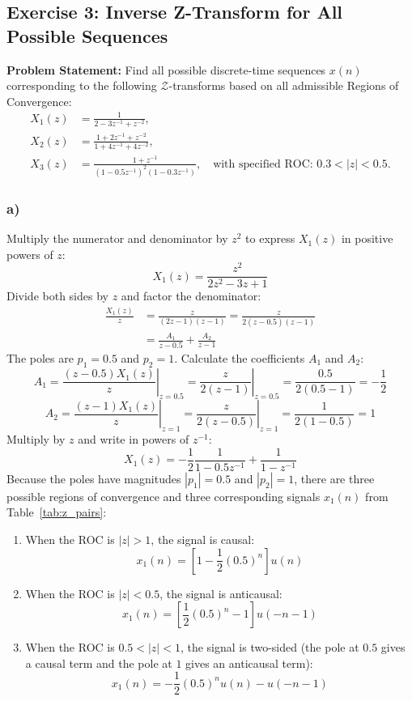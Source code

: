 \documentclass[12pt,a4paper]{article}
\begin{document}
\subsection{Exercise 3: Inverse Z-Transform for All Possible Sequences}
\textbf{Problem Statement:} Find all possible discrete-time sequences $x(n)$ corresponding to the following $\mathcal{Z}$-transforms based on all admissible Regions of Convergence:
\begin{align*}
    X_1(z) &= \frac{1}{2 - 3z^{-1} + z^{-2}}, \\
    X_2(z) &= \frac{1 + 2z^{-1} + z^{-2}}{1 + 4z^{-1} + 4z^{-2}}, \\
    X_3(z) &= \frac{1 + z^{-1}}{(1 - 0.5z^{-1})^2 (1 - 0.3z^{-1})}, \quad \text{with specified ROC: } 0.3 < |z| < 0.5.
\end{align*}

\subsubsection*{a)}
Multiply the numerator and denominator by $z^2$ to express $X_1(z)$ in positive powers of $z$:
\[
X_1(z) = \frac{z^2}{2z^2 - 3z + 1}
\]
Divide both sides by $z$ and factor the denominator:
\[
\begin{aligned}
\frac{X_1(z)}{z} &= \frac{z}{(2z - 1)(z - 1)} = \frac{z}{2(z - 0.5)(z - 1)} \\
&= \frac{A_1}{z - 0.5} + \frac{A_2}{z - 1}
\end{aligned}
\]
The poles are $p_1 = 0.5$ and $p_2 = 1$. Calculate the coefficients $A_1$ and $A_2$:
\[
A_1 = \left. \frac{(z - 0.5)X_1(z)}{z} \right|_{z = 0.5} = \left. \frac{z}{2(z - 1)} \right|_{z = 0.5} = \frac{0.5}{2(0.5 - 1)} = -\frac{1}{2}
\]
\[
A_2 = \left. \frac{(z - 1)X_1(z)}{z} \right|_{z = 1} = \left. \frac{z}{2(z - 0.5)} \right|_{z = 1} = \frac{1}{2(1 - 0.5)} = 1
\]
Multiply by $z$ and write in powers of $z^{-1}$:
\[
X_1(z) = -\frac{1}{2}\frac{1}{1 - 0.5z^{-1}} + \frac{1}{1 - z^{-1}}
\]
Because the poles have magnitudes $|p_1| = 0.5$ and $|p_2| = 1$, there are three possible regions of convergence and three corresponding signals $x_1(n)$ from Table~\ref{tab:z_pairs}:
\begin{enumerate}
\item When the ROC is $|z| > 1$, the signal is causal:
\[
x_1(n) = \left[1 - \frac{1}{2}(0.5)^n\right]u(n)
\]
\item When the ROC is $|z| < 0.5$, the signal is anticausal:
\[
x_1(n) = \left[\frac{1}{2}(0.5)^n - 1\right]u(-n - 1)
\]
\item When the ROC is $0.5 < |z| < 1$, the signal is two-sided (the pole at $0.5$ gives a causal term and the pole at $1$ gives an anticausal term):
\[
x_1(n) = -\frac{1}{2}(0.5)^n u(n) - u(-n - 1)
\]
\end{enumerate}
\end{document}
